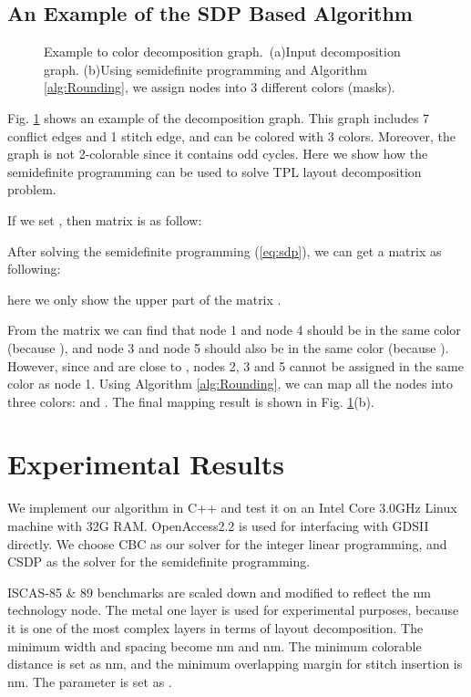 \documentclass[10pt,conference]{IEEEtran}
\begin{document}
\subsection{An Example of the SDP Based Algorithm}

\begin{figure}[tb]
	\centering
	\caption{Example to color decomposition graph.~(a)Input decomposition graph.
	(b)Using semidefinite programming and Algorithm \ref{alg:Rounding}, we assign nodes into 3 different colors (masks).}
\label{fig:example}
\end{figure}

Fig. \ref{fig:example} shows an example of the decomposition graph.
This graph includes 7 conflict edges and 1 stitch edge, and can be colored with 3 colors.
Moreover, the graph is not 2-colorable since it contains odd cycles.
Here we show how the semidefinite programming can be used to solve TPL layout decomposition problem.

If we set , then matrix  is as follow:


After solving the semidefinite programming (\ref{eq:sdp}), we can get a matrix  as following:

here we only show the upper part of the matrix .

From the matrix  we can find that node 1 and node 4 should be in the same color (because ), and node 3 and node 5 should also be in the same color (because ).
However, since  and  are close to , nodes 2, 3 and 5 cannot be assigned in the same color as node 1.
Using Algorithm \ref{alg:Rounding}, we can map all the nodes into three colors:  and .
The final mapping result is shown in Fig. \ref{fig:example}(b).




 \section{Experimental Results}
\label{chap:result}

We implement our algorithm in C++ and test it on an Intel Core 3.0GHz Linux machine with 32G RAM.
OpenAccess2.2 \cite{OpenAccess} is used for interfacing with GDSII directly.
We choose CBC \cite{cbc} as our solver for the integer linear programming, and CSDP \cite{CSDP} as the solver for the semidefinite programming.

ISCAS-85 \& 89 benchmarks are scaled down and modified to reflect the nm technology node.
The metal one layer is used for experimental purposes, because it is one of the most complex layers in terms of layout decomposition.
The minimum width and spacing become nm and nm.
The minimum colorable distance is set as nm, and the minimum overlapping margin for stitch insertion is nm.
The parameter  is set as .
\end{document}
